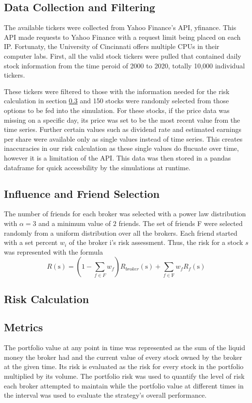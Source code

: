 \documentclass[letterpaper, 10 pt, proceedings]{ieeetran}
\begin{document}
	\subsection{Data Collection and Filtering}\label{subsec:data}
	The available tickers were collected from Yahoo Finance's API, yfinance. This API made requests to Yahoo Finance with a request limit being placed on each IP. Fortunaty, the University of Cincinnati offers multiple CPUs in their computer labs. First, all the valid stock tickers were pulled that contained daily stock information from the time peroid of 2000 to 2020, totally 10,000 individual tickers. \par
	These tickers were filtered to those with the information needed for the risk calculation in section \ref{subsec:risk} and 150 stocks were randomly selected from those options to be fed into the simulation. For these stocks, if the price data was missing on a specific day, its price was set to be the most recent value from the time series. Further certain values such as dividend rate and estimated earnings per share were available only as single values instead of time series. This creates inaccuracies in our risk calculation as these single values do flucuate over time, however it is a limitation of the API. This data was then stored in a pandas dataframe for quick accessbility by the simulations at runtime.
	

	\subsection{Influence and Friend Selection}\label{subsec:friends}
	The number of friends for each broker was selected with a power law distribution with $\alpha = 3$ and a minimum value of $2$ friends. The set of friends F were selected randomly from a uniform distribution over all the brokers. Each friend started with a set percent $w_i$ of the broker i's risk assessment. Thus, the risk for a stock $s$ was represented with the formula 
	$$R(\text{s}) = (1-\sum\limits_{f\in F} w_f) R_{broker}(\text{s}) + \sum\limits_{f\in \text{F}} w_f R_f(\text{s})$$

	\subsection{Risk Calculation}\label{subsec:risk}
	
	\subsection{Metrics}\label{subsec:metrics}	
	The portfolio value at any point in time was represented as the sum of the liquid money the broker had and the current value of every stock owned by the broker at the given time. Its risk is evaluated as the risk for every stock in the portfolio multiplied by its volume. The portfolio risk was used to quantify the level of risk each broker attempted to maintain while the portfolio value at different times in the interval was used to evaluate the strategy's overall performance.
\end{document}
